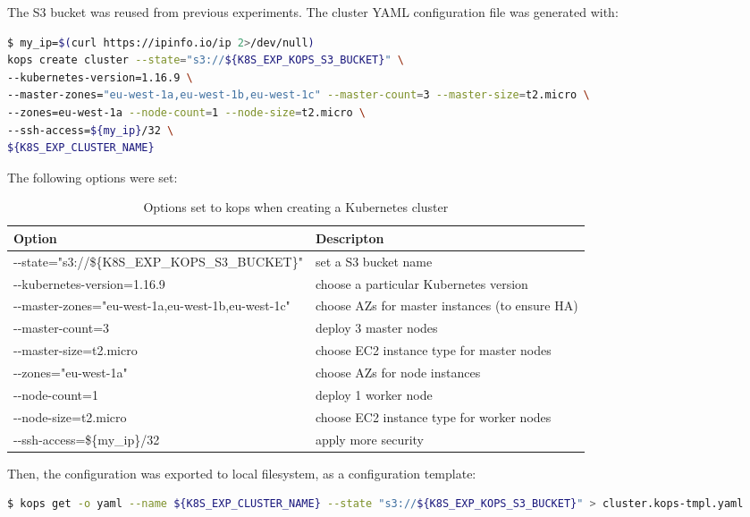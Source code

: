 The S3 bucket was reused from previous experiments. The cluster YAML configuration file was generated with:
\begin{lstlisting}[basicstyle=\tiny,caption={Commands used to generate a cluster configuration with kops},captionpos=b,language=Bash,xleftmargin=1cm]
$ my_ip=$(curl https://ipinfo.io/ip 2>/dev/null)
kops create cluster --state="s3://${K8S_EXP_KOPS_S3_BUCKET}" \
--kubernetes-version=1.16.9 \
--master-zones="eu-west-1a,eu-west-1b,eu-west-1c" --master-count=3 --master-size=t2.micro \
--zones=eu-west-1a --node-count=1 --node-size=t2.micro \
--ssh-access=${my_ip}/32 \
${K8S_EXP_CLUSTER_NAME}
\end{lstlisting}

The following options were set:

\begin{table}[H]
\small
\begin{tabularx}{1\textwidth} {
  | >{\centering\arraybackslash}X
  | >{\centering\arraybackslash}X | }
 \hline
  \textbf{Option} & \textbf{Descripton}  \\
 \hline
 -{}-state="s3://\$\{K8S\_EXP\_KOPS\_S3\_BUCKET\}"  & set a S3 bucket name \\
 \hline
 -{}-kubernetes-version=1.16.9  & choose a particular Kubernetes version \\
 \hline
 -{}-master-zones="eu-west-1a,eu-west-1b,eu-west-1c"  & choose AZs for master instances (to ensure HA) \\
 \hline
 -{}-master-count=3  & deploy 3 master nodes \\
 \hline
 -{}-master-size=t2.micro  & choose EC2 instance type for master nodes \\
 \hline
 -{}-zones="eu-west-1a"  & choose AZs for node instances \\
 \hline
 -{}-node-count=1  & deploy 1 worker node \\
 \hline
 -{}-node-size=t2.micro  & choose EC2 instance type for worker nodes \\
 \hline
 -{}-ssh-access=\$\{my\_ip\}/32  & apply more security \\
 \hline
\end{tabularx}
\caption{\label{tab:kops-production-options}Options set to kops when creating a Kubernetes cluster}
\end{table}


Then, the configuration was exported to local filesystem, as a configuration template:
\begin{lstlisting}[basicstyle=\tiny,caption={Command used export kops configuration from S3 to a local file},captionpos=b,language=Bash,xleftmargin=1cm]
$ kops get -o yaml --name ${K8S_EXP_CLUSTER_NAME} --state "s3://${K8S_EXP_KOPS_S3_BUCKET}" > cluster.kops-tmpl.yaml
\end{lstlisting}

